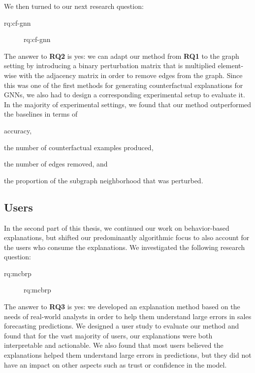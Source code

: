 We then turned to our next research question:

\begin{description}\item[\acs{rq:cf-gnn}]\acl{rq:cf-gnn}\end{description}

\noindent
The answer to \textbf{RQ2} is yes: we can adapt our method from \textbf{RQ1} to the graph setting by introducing a binary perturbation matrix that is multiplied element-wise with the adjacency matrix in order to remove edges from the graph. 
Since this was one of the first methods for generating counterfactual explanations for GNNs, we also had to design a corresponding experimental setup to evaluate it. 
In the majority of experimental settings, we found that our method outperformed the baselines in terms of
\begin{inparaenum}[(i)]
	\item accuracy, 
	\item the number of counterfactual examples produced, 
	\item the number of edges removed, and
	\item the proportion of the subgraph neighborhood that was perturbed.
\end{inparaenum}



\subsection{Users}
In the second part of this thesis, we continued our work on behavior-based explanations, but shifted our predominantly algorithmic focus to also account for the users who consume the explanations. 
We investigated the following research question:

\begin{description}\item[\acs{rq:mcbrp}]\acl{rq:mcbrp}\end{description}

\noindent
The answer to \textbf{RQ3} is yes: we developed an explanation method based on the needs of real-world analysts in order to help them understand large errors in sales forecasting predictions. 
We designed a user study to evaluate our method and found that for the vast majority of users, our explanations were both interpretable and actionable. 
We also found that most users believed the explanations helped them understand large errors in predictions, but they did not have an impact on other aspects such as trust or confidence in the model. 



